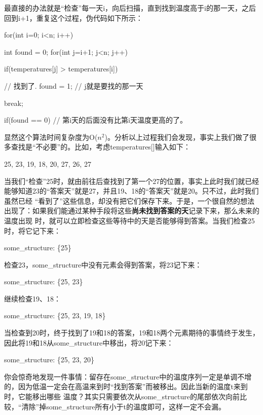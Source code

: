 最直接的办法就是“检查”每一天i，向后扫描，直到找到温度高于i的那一天，之后回到i+1，重复这个过程，伪代码如下所示：
\begin{cppcode}
    for(int i=0; i<n; i++) {
        int found = 0;
        for(int j=i+1; j<n; j++) {
            if(temperatures[j] > temperatures[i]) {
                // 找到了.
                found = 1;
                // j就是要找的那一天

                break;
            }
        }
        if(found == 0) {
            // 第i天的后面没有比第i天温度更高的了。
        }
    }
\end{cppcode}
显然这个算法时间复杂度为O(\(n^2\))。分析以上过程我们会发现，事实上我们做了很多查找是“不必要”的。比如，考虑temperatures[]输入如下：
\begin{bulk}
    \begin{center}
        25, 23, 19, 18, 20, 27, 26, 27
    \end{center}
\end{bulk}
当我们“检查”25时，就由前往后查找到了第一个27的位置，事实上此时我们就已经能够知道23的“答案天”就是27，并且19、18的“答案天”就是20。只不过，此时我们虽然已经
“看到了”这些信息，却没有把它们保存下来。于是，一个很自然的想法出现了：如果我们能通过某种手段将这些\textbf{尚未找到答案的天}记录下来，那么未来的温度出现
时，就可以立即检查这些等待中的天是否能够得到答案。当我们检查25时，将它记下来：
\begin{bulk}
    \begin{center}
        some\_structure: \{25\}
    \end{center}
\end{bulk}
检查23，some\_structure中没有元素会得到答案，将23记下来：
\begin{bulk}
    \begin{center}
        some\_structure: \{25, 23\}
    \end{center}
\end{bulk}
继续检查19、18：
\begin{bulk}
    \begin{center}
        some\_structure: \{25, 23, 19, 18\}
    \end{center}
\end{bulk}
当检查到20时，终于找到了19和18的答案，19和18两个元素期待的事情终于发生，因此将19和18从some\_structure中移出，将20记下来：
\begin{bulk}
    \begin{center}
        some\_structure: \{25, 23, 20\}
    \end{center}
\end{bulk}
你会惊奇地发现一件事情：留存在some\_structure中的温度序列一定是单调不增的，因为低温一定会在高温来到时“找到答案”而被移出。因此当新的温度t来到时，它能移出哪些
温度？其实只需要依次从some\_structure的尾部依次向前比较，“清除”掉some\_structure所有小于t的温度即可，这样一定不会漏。

